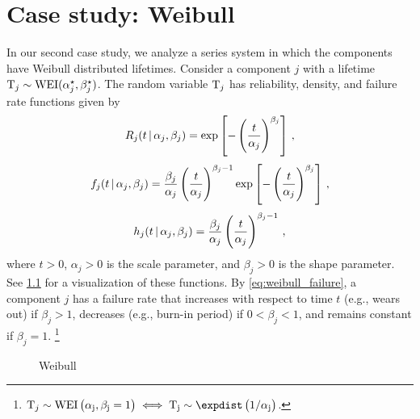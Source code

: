 \documentclass[
    11pt,
    extrafontsizes,
    article,
    oldfontcommands,
    final,
    oneside,
    openany,
    hidelinks]{memoir}
\begin{document}
\chapter{Case study: Weibull}
In our second case study, we analyze a series system in which the components have Weibull distributed lifetimes. Consider a component $j$ with a lifetime $\mathrm{T}_j \sim \text{WEI}({\alpha}^{\star}_j, {\beta}^{\star}_j)$.
The random variable $\mathrm{T}_j$ has reliability, density, and failure rate functions given by
\begin{equation}
\label{eq:weibull_reliability}
R_j(t {\,|\,} \alpha_j, \beta_j) =
    \exp \left[-\left( \frac{t}{\alpha_j}\right)^{\beta_j} \right]\,,
\end{equation}
\begin{equation}
\label{eq:weibull_pdf}
f_j(t {\,|\,} \alpha_j, \beta_j) =
    \frac{\beta_j}{\alpha_j}\left(\frac{t}{\alpha_j}\right)^{\beta_j-1} \exp \left [-\left(\frac{t}{\alpha_j}\right)^{\beta_j} \right ]\,,
\end{equation}
\begin{equation}
\label{eq:weibull_failure}
h_j(t {\,|\,} \alpha_j, \beta_j) =
    \frac{\beta_j}{\alpha_j}\left(\frac{t}{\alpha_j}\right)^{\beta_j-1}\,,
\end{equation}
where $t > 0$, $\alpha_j > 0$ is the scale parameter, and $\beta_j > 0$ is the shape parameter. See \cref{fig:weibull_series_functions} for a visualization of these functions.
By \cref{eq:weibull_failure}, a component $j$ has a failure rate that increases with respect to time $t$ (e.g., wears out) if $\beta_j > 1$, decreases (e.g., burn-in period) if $0 < \beta_j < 1$, and remains constant if $\beta_j = 1$.
\footnote{$\cv_j \sim \rm{WEI}\left(\alpha_j, \beta_j = 1\right) \iff \cv_j \sim \expdist\left(1/\alpha_j\right)$.}
\begin{figure}
    \caption{Weibull}
    \label{fig:weibull_series_functions}
    \centering
\end{figure}
\end{document}
